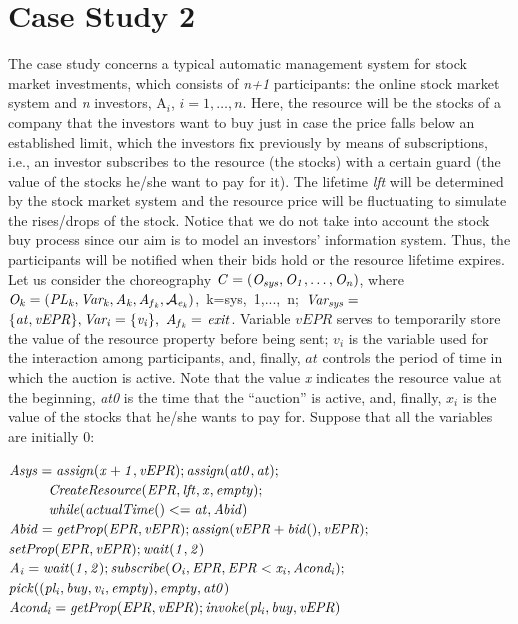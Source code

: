 \section{Case Study 2}
The case study concerns a typical automatic management system for stock market investments, which consists of {\em n+1} participants:
the online stock market system and {\em n} investors, A$_i$, $i=1,\ldots, n$. Here, the resource will be the stocks of a company that the investors want to buy just in case the price falls below an established limit, which the investors fix previously by means of subscriptions, i.e., an investor subscribes to the resource (the stocks) with a certain guard (the value of the stocks he/she want to pay for it). The lifetime {\em lft} will be determined by the stock market system and the resource price will be fluctuating to simulate the rises/drops of the stock. Notice that we do not take into account the stock buy process since our aim is to model an investors' information system. Thus, the participants will be notified when their bids hold or the resource lifetime expires.  
Let us consider the choreography ${\it C=(O_{sys},O_1,\ldots,O_n)}$, where 
\mbox{${\it O_k=(PL_k,Var_k,A_k,A_{f{_k}},\mathcal{A}_{e{_k}})}$,~k=sys,~1,...,~n;}~\mbox{${\it Var_{sys}=}$} \\${\it \{at,vEPR\}, Var_i= \{v_i\},\ A_{f{_k}}=}$  ${\it exit}$. Variable $v{EPR}$ serves to temporarily store the value of the resource property before being sent; $v_i$ is the variable used for the interaction among participants, and, finally, $at$ controls the period of time in which the auction is active. Note that the value {\em x} indicates the resource value at the beginning, {\em at0} is the time that the ``auction'' is active, and, finally, {\em $x_i$} is the value of the stocks that he/she wants to pay for. Suppose that all the variables are initially $0$: 
\begin{flushleft}
\small{ 
${\it Asys=assign(x+1,vEPR);assign(at0,at);}$\\
$\hspace{1cm}{\it  CreateResource(EPR,lft,x,empty);}$\\	
$\hspace{1cm}{\it  while(actualTime()<=at,Abid)}$\\
${\it Abid=getProp(EPR,vEPR);assign(vEPR+bid(),vEPR);}$\\	
\hspace{1cm}${\it setProp(EPR,vEPR);wait(1,2)}$\\
${\it A_i=wait(1,2);subscribe(O_i,EPR,EPR<x_i,Acond_i);}$\\
\hspace{0.8cm}${\it pick((pl_i,buy,v_i,empty),empty,at0)}$\\
${\it Acond_i=getProp(EPR,vEPR);invoke(pl_i,buy,vEPR)}$\\
}
\end{flushleft}


